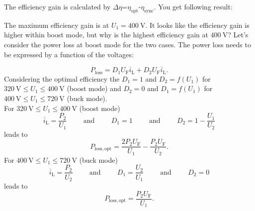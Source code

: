 \begin{solutionblock}
	The efficiency gain is calculated by $\Delta \eta$=$\eta_\mathrm{opt}$-$\eta_\mathrm{sync}$.
	You get following result:

	

	The maximum efficiency gain is at $U_\mathrm{1}=\SI{400}{\volt}$.
	It looks like the efficiency gain is higher within boost mode, but why is the highest efficiency gain at $\SI{400}{\volt}$?
	Let's consider the power loss at boost mode for the two cases. The power loss needs to be expressed by a function of the voltages:

	\begin{equation}
		P_\mathrm{loss}=D_1 U_\mathrm{F} \overline{i}_\mathrm{L} + D_2 U_\mathrm{F} \overline{i}_\mathrm{L}.
		\label{eq:ploss2}
	\end{equation}
	Considering the optimal efficiency the $D_1=1$ and $D_2=f(U_\mathrm{1})$ for $\SI{320}{\volt} \leq U_\mathrm{1} \leq \SI{400}{\volt}$
	(boost mode) and $D_2=0$ and $D_1=f(U_\mathrm{1})$ for $\SI{400}{\volt} \le U_\mathrm{1} \leq \SI{720}{\volt}$ (buck mode). \\
	For $\SI{320}{\volt} \leq U_\mathrm{1} \leq \SI{400}{\volt}$ (boost mode)
	\begin{equation}
		\overline{i}_\mathrm{L}=\frac{P_\mathrm{2}}{U_\mathrm{1}}
		\hspace{1cm} \mathrm{and} \hspace{1cm}
		D_1=1
		\hspace{1cm} \mathrm{and} \hspace{1cm}
		D_2=1-\frac{U_\mathrm{1}}{U_\mathrm{2}}
	\end{equation}
	leads to
	\begin{equation}
		P_\mathrm{loss,opt}=\frac{2 P_\mathrm{2} U_\mathrm{F}}{U_\mathrm{1}} - \frac{P_\mathrm{2} U_\mathrm{F}}{U_\mathrm{2}}.
		\label{eq:Plossoptboost}
	\end{equation}
	For $\SI{400}{\volt} \le U_\mathrm{1} \leq \SI{720}{\volt}$ (buck mode)
	\begin{equation}
		\overline{i}_\mathrm{L}=\frac{P_\mathrm{2}}{U_\mathrm{2}}
		\hspace{1cm} \mathrm{and} \hspace{1cm}
		D_1=\frac{U_\mathrm{2}}{U_\mathrm{1}}
		\hspace{1cm} \mathrm{and} \hspace{1cm}
		D_2=0
	\end{equation}
	leads to
	\begin{equation}
		P_\mathrm{loss,opt}=\frac{P_\mathrm{2} U_\mathrm{F}}{U_\mathrm{1}}.
		\label{eq:Plossoptbuck}
	\end{equation}


\end{solutionblock}
